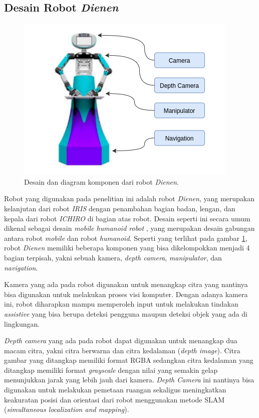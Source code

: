 \subsection{Desain Robot \emph{Dienen}}
\label{subsec:desainrobotdienen}

\begin{figure} [ht]
  \centering
  \includegraphics[scale=0.5]{gambar/komponen-robot.png}
  \caption{Desain dan diagram komponen dari robot \emph{Dienen}.}
  \label{fig:komponenrobot}
\end{figure}

Robot yang digunakan pada penelitian ini adalah robot \emph{Dienen},
  yang merupakan kelanjutan dari robot \emph{IRIS} \citep{cit:dikairono2020}\citep{cit:zanuar2019} dengan penambahan bagian badan, lengan, dan kepala dari robot \emph{ICHIRO} \citep{cit:muhtadin2019} di bagian atas robot.
Desain seperti ini secara umum dikenal sebagai desain \emph{mobile humanoid robot} \citep{cit:mohamed2012}, yang merupakan desain gabungan antara robot \emph{mobile} dan robot \emph{humanoid}.
Seperti yang terlihat pada gambar \ref{fig:komponenrobot},
  robot \emph{Dienen} memiliki beberapa komponen yang bisa dikelompokkan menjadi 4 bagian terpisah, yakni sebuah kamera, \emph{depth camera}, \emph{manipulator}, dan \emph{navigation}.

Kamera yang ada pada robot digunakan untuk menangkap citra yang nantinya bisa digunakan untuk melakukan proses visi komputer.
Dengan adanya kamera ini, robot diharapkan mampu memperoleh input untuk melakukan tindakan \emph{assistive} yang bisa berupa deteksi pengguna maupun deteksi objek yang ada di lingkungan.

\emph{Depth camera} yang ada pada robot dapat digunakan untuk menangkap dua macam citra,
  yakni citra berwarna dan citra kedalaman (\emph{depth image}).
Citra gambar yang ditangkap memiliki format RGBA sedangkan citra kedalaman yang ditangkap memiliki format \emph{grayscale} dengan nilai yang semakin gelap menunjukkan jarak yang lebih jauh dari kamera.
\emph{Depth Camera} ini nantinya bisa digunakan untuk melakukan pemetaan ruangan sekaligus meningkatkan keakuratan posisi dan orientasi dari robot menggunakan metode SLAM (\emph{simultaneous localization and mapping}).

